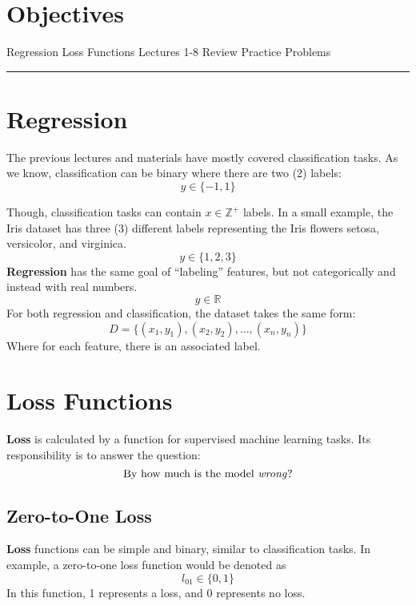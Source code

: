 
\section*{Objectives}
\begin{outline}
    \1 Regression
    \1 Loss Functions
    \1 Lectures 1-8 Review
    \1 Practice Problems
\end{outline}

\rule[0.0051in]{\textwidth}{0.00025in}


\section{Regression}
The previous lectures and materials have mostly covered classification tasks. As we know, classification can be binary where there are two (2) labels: 
\[
y \in \{-1, 1\}
\]

Though, classification tasks can contain $x\mathbb{\in Z^+}$ labels. In a small example, the Iris dataset has three (3) different labels representing the Iris flowers setosa, versicolor, and virginica.
\[
y \in \{1, 2, 3\}
\]
\textbf{Regression} has the same goal of ``labeling'' features, but not categorically and instead with real numbers.
\[
y \in \mathbb{R}
\]
For both regression and classification, the dataset takes the same form:
\[
D = \{(x_1, y_1), (x_2, y_2),...,(x_n, y_n)\}
\]
Where for each feature, there is an associated label.
\section{Loss Functions}
\textbf{Loss} is calculated by a function for supervised machine learning tasks. Its responsibility is to answer the question: 
\[
\text{By how much is the model \textit{wrong}?}
\]

\subsection{Zero-to-One Loss}
\textbf{Loss} functions can be simple and binary, similar to classification tasks. In example, a zero-to-one loss function would be denoted as
\[
l_{01} \in \{0, 1\}
\]
In this function, 1 represents a loss, and 0 represents no loss.

